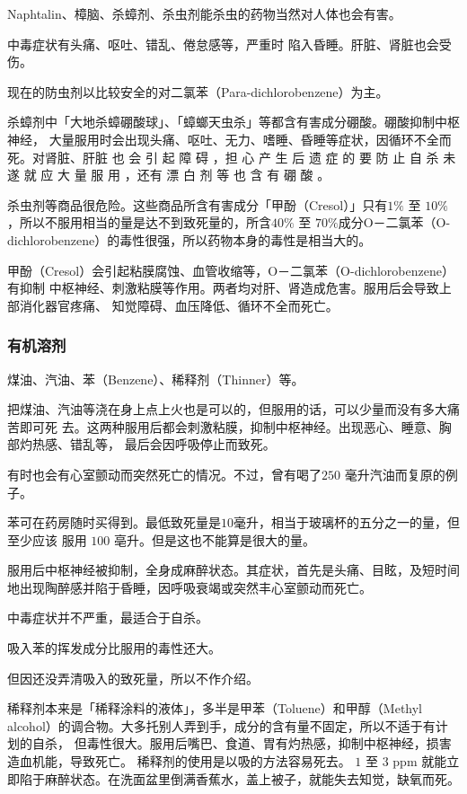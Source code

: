 \documentclass[UTF8]{ctexart}
\begin{document}
Naphtalin、樟脑、杀蟑剂、杀虫剂能杀虫的药物当然对人体也会有害。

中毒症状有头痛、呕吐、错乱、倦怠感等，严重时 陷入昏睡。肝脏、肾脏也会受伤。

现在的防虫剂以比较安全的对二氯苯（Para-dichlorobenzene）为主。

杀蟑剂中「大地杀蟑硼酸球」、「蟑螂天虫杀」等都含有害成分硼酸。硼酸抑制中枢神经，
大量服用时会出现头痛、呕吐、无力、嗜睡、昏睡等症状，因循环不全而死。对肾脏、肝脏
也 会 引 起 障 碍 ，担 心 产 生 后 遗 症 的 要 防 止 自 杀 未 遂 就 应 大 量 服 用 ，还有 漂 白 剂 等 也 含 有 硼 酸 。

杀虫剂等商品很危险。这些商品所含有害成分「甲酚（Cresol）」只有$1\%$ 至 $10\%$，所以不服用相当的量是达不到致死量的，所含$40\%$ 至 $70\%$成分O－二氯苯（O-dichlorobenzene）的毒性很强，所以药物本身的毒性是相当大的。

甲酚（Cresol）会引起粘膜腐蚀、血管收缩等，O－二氯苯（O-dichlorobenzene）有抑制
中枢神经、刺激粘膜等作用。两者均对肝、肾造成危害。服用后会导致上部消化器官疼痛、
知觉障碍、血压降低、循环不全而死亡。

\subsubsection{有机溶剂}

煤油、汽油、苯（Benzene）、稀释剂（Thinner）等。

把煤油、汽油等浇在身上点上火也是可以的，但服用的话，可以少量而没有多大痛苦即可死
去。这两种服用后都会刺激粘膜，抑制中枢神经。出现恶心、睡意、胸部灼热感、错乱等，
最后会因呼吸停止而致死。  

有时也会有心室颤动而突然死亡的情况。不过，曾有喝了$250$
毫升汽油而复原的例子。

苯可在药房随时买得到。最低致死量是$10$毫升，相当于玻璃杯的五分之一的量，但至少应该
服用 $100$ 亳升。但是这也不能算是很大的量。

服用后中枢神经被抑制，全身成麻醉状态。其症状，首先是头痛、目眩，及短时间地出现陶醉感并陷于昏睡，因呼吸衰竭或突然丰心室颤动而死亡。

中毒症状并不严重，最适合于自杀。

吸入苯的挥发成分比服用的毒性还大。

但因还没弄清吸入的致死量，所以不作介绍。

稀释剂本来是「稀释涂料的液体」，多半是甲苯（Toluene）和甲醇（Methyl alcohol）的调合物。大多托别人弄到手，成分的含有量不固定，所以不适于有计划的自杀，
但毒性很大。服用后嘴巴、食道、胃有灼热感，抑制中枢神经，损害造血机能，导致死亡。
稀释剂的使用是以吸的方法容易死去。 $1$ 至 $3$ ppm 就能立即陷于麻醉状态。在洗面盆里倒满香蕉水，盖上被子，就能失去知觉，缺氧而死。
\end{document}

